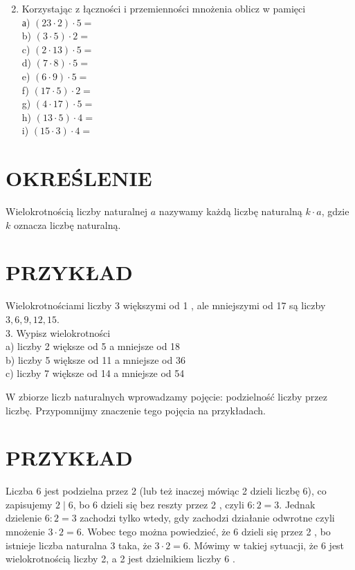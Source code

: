 \documentclass[10pt]{article}
\begin{document}
\begin{enumerate}
  \setcounter{enumi}{1}
  \item Korzystając z łączności i przemienności mnożenia oblicz w pamięci\\
а) \((23 \cdot 2) \cdot 5=\)\\
b) \((3 \cdot 5) \cdot 2=\)\\
c) \((2 \cdot 13) \cdot 5=\)\\
d) \((7 \cdot 8) \cdot 5=\)\\
e) \((6 \cdot 9) \cdot 5=\)\\
f) \((17 \cdot 5) \cdot 2=\)\\
g) \((4 \cdot 17) \cdot 5=\)\\
h) \((13 \cdot 5) \cdot 4=\)\\
i) \((15 \cdot 3) \cdot 4=\)
\end{enumerate}

\section*{OKREŚLENIE}
Wielokrotnością liczby naturalnej \(a\) nazywamy każdą liczbę naturalną \(k \cdot a\), gdzie \(k\) oznacza liczbę naturalną.

\section*{PRZYKŁAD}
Wielokrotnościami liczby 3 większymi od 1 , ale mniejszymi od 17 są liczby \(3,6,9,12,15\).\\
3. Wypisz wielokrotności\\
a) liczby 2 większe od 5 a mniejsze od 18\\
b) liczby 5 większe od 11 a mniejsze od 36\\
c) liczby 7 większe od 14 a mniejsze od 54

W zbiorze liczb naturalnych wprowadzamy pojęcie: podzielność liczby przez liczbę. Przypomnijmy znaczenie tego pojęcia na przykładach.

\section*{PRZYKŁAD}
Liczba 6 jest podzielna przez 2 (lub też inaczej mówiąc 2 dzieli liczbę 6), co zapisujemy \(2 \mid 6\), bo 6 dzieli się bez reszty przez 2 , czyli \(6: 2=3\). Jednak dzielenie \(6: 2=3\) zachodzi tylko wtedy, gdy zachodzi działanie odwrotne czyli mnożenie \(3 \cdot 2=6\). Wobec tego można powiedzieć, że 6 dzieli się przez 2 , bo istnieje liczba naturalna 3 taka, że \(3 \cdot 2=6\). Mówimy w takiej sytuacji, że 6 jest wielokrotnością liczby 2, a 2 jest dzielnikiem liczby 6 .
\end{document}
